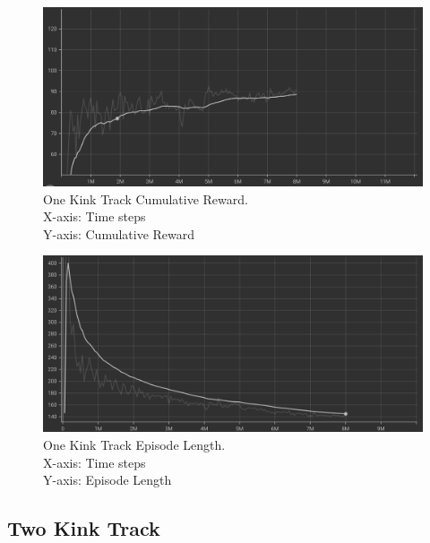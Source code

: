 \begin{figure}[H]
    \centering
    \includegraphics[width=1.0\textwidth]{images/graphs/OneKink-Reward.png}
    \caption{\centering One Kink Track Cumulative Reward. \\ X-axis: Time steps \\ Y-axis: Cumulative Reward}
    \label{fig:rl}
\end{figure}

\begin{figure}[H]
    \centering
    \includegraphics[width=1.0\textwidth]{images/graphs/OneKink-Episode.png}
    \caption{\centering One Kink Track Episode Length. \\ X-axis: Time steps \\ Y-axis: Episode Length}
    \label{fig:rl}
\end{figure}



\subsection{Two Kink Track}

